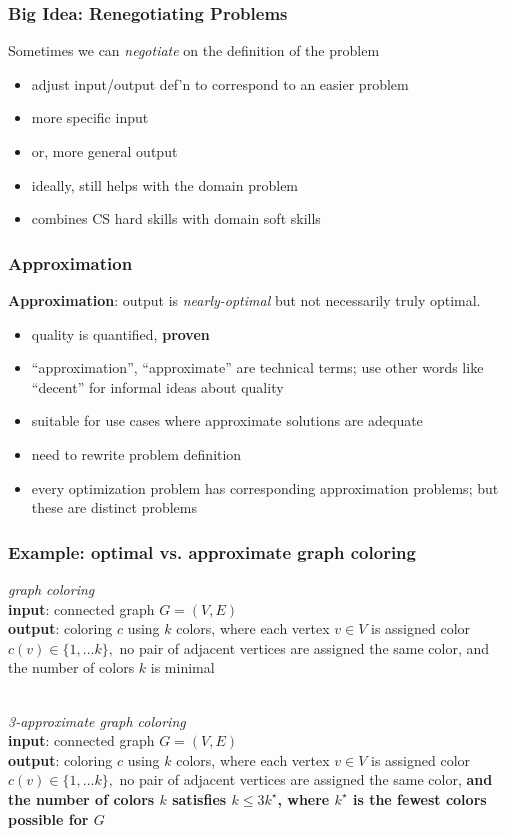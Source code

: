 \documentclass[10pt,aspectratio=169]{beamer}
\newcommand{\stanza}{ \\~\ }
\begin{document}
  \begin{frame} \frametitle{Big Idea: Renegotiating Problems}
    Sometimes we can \emph{negotiate} on the definition of the problem
  \begin{itemize}
    \item adjust input/output def'n to correspond to an easier problem
    \item more specific input
    \item or, more general output
    \item ideally, still helps with the domain problem
    \item combines CS hard skills with domain soft skills
  \end{itemize}
  \end{frame}
  
  \begin{frame} \frametitle{Approximation}
  \textbf{Approximation}: output is \emph{nearly-optimal} but not necessarily
  truly optimal.
  \begin{itemize}
    \item quality is quantified, \textbf{proven}
    \item ``approximation'', ``approximate'' are technical terms; use other words
      like ``decent'' for informal ideas about quality
    \item suitable for use cases where approximate solutions are adequate
    \item need to rewrite problem definition
    \item every optimization problem has corresponding approximation problems; but these
      are distinct problems
  \end{itemize}
  \end{frame}
  
  \begin{frame} \frametitle{Example: optimal vs. approximate graph coloring}
  \emph{graph coloring} \\
  \textbf{input}: connected graph $G=(V,E)$ \\
  \textbf{output}: coloring $c$ using $k$ colors, where each vertex $v \in V$ is assigned color
    $c(v) \in \{1, \ldots k\},$ no pair of adjacent vertices are assigned the
    same color, and the number of colors $k$ is minimal
  \stanza
  
  \emph{3-approximate graph coloring} \\
  \textbf{input}: connected graph $G=(V,E)$ \\
  \textbf{output}: coloring $c$ using $k$ colors, where each vertex $v \in V$ is assigned color
    $c(v) \in \{1, \ldots k\},$ no pair of adjacent vertices are assigned the
    same color, \textbf{and the number of colors $k$ satisfies $k \leq 3 k^\star$,
    where $k^\star$ is the fewest colors possible for $G$}
  \end{frame}
  
\end{document}
